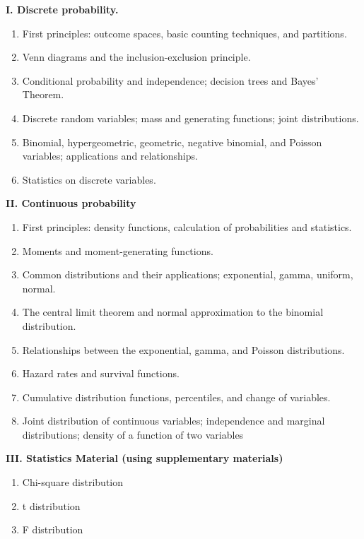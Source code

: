 \documentclass{osucourse}
\begin{document}
\begin{TopicsOutline}
\textbf{I. Discrete probability.}

\begin{enumerate}
\def\labelenumi{\arabic{enumi}.}
\item
  First principles: outcome spaces, basic counting techniques, and
  partitions.
\item
  Venn diagrams and the inclusion-exclusion principle.
\item
  Conditional probability and independence; decision trees and Bayes'
  Theorem.
\item
  Discrete random variables; mass and generating functions; joint
  distributions.
\item
  Binomial, hypergeometric, geometric, negative binomial, and Poisson
  variables; applications and relationships.
\item
  Statistics on discrete variables.
\end{enumerate}

\textbf{II. Continuous probability}

\begin{enumerate}
\def\labelenumi{\arabic{enumi}.}
\setcounter{enumi}{6}
\item
  First principles: density functions, calculation of probabilities and
  statistics.
\item
  Moments and moment-generating functions.
\item
  Common distributions and their applications; exponential, gamma,
  uniform, normal.
\item
  The central limit theorem and normal approximation to the binomial
  distribution.
\item
  Relationships between the exponential, gamma, and Poisson
  distributions.
\item
  Hazard rates and survival functions.
\item
  Cumulative distribution functions, percentiles, and change of
  variables.
\item
  Joint distribution of continuous variables; independence and marginal
  distributions; density of a function of two variables
\end{enumerate}

\textbf{III. Statistics Material (using supplementary materials)}

\begin{enumerate}
\def\labelenumi{\arabic{enumi}.}
\setcounter{enumi}{14}
\tightlist
\item
  Chi-square distribution
\item
  t distribution
\item
  F distribution
\end{enumerate}
\end{TopicsOutline}
\end{document}

